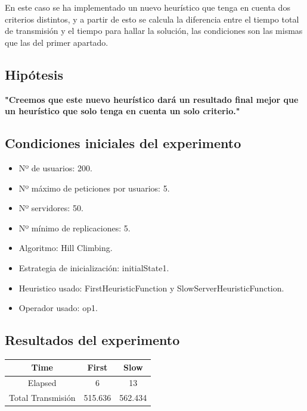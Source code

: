 \documentclass[a4paper,10pt]{report}
\begin{document}
		En este caso se ha implementado un nuevo heurístico que tenga en cuenta dos criterios distintos, y a partir de esto se calcula la diferencia entre el tiempo total de transmisión y el tiempo para hallar la solución, las condiciones son las mismas que las del primer apartado.\newline

        \subsection*{Hipótesis}
		\textbf{"Creemos que este nuevo heurístico dará un resultado final mejor que un heurístico que solo tenga en cuenta un solo criterio."}

		\subsection*{Condiciones iniciales del experimento}
		\begin{itemize}
		    \item Nº de usuarios: 200.
    		\item Nº máximo de peticiones por usuarios: 5.
    		\item Nº servidores: 50.
    		\item Nº mínimo de replicaciones: 5.
    		\item Algoritmo: Hill Climbing.
    		\item Estrategia de inicialización: initialState1.
    		\item Heuristico usado: FirstHeuristicFunction y SlowServerHeuristicFunction.
    		\item Operador usado: op1.
		\end{itemize}

		\subsection*{Resultados del experimento}
		\begin{table}[H]
		\centering
        \begin{tabular}{c|c|c}
            Time & First & Slow \\
            \hline
            \hline
            Elapsed & 6 & 13 \\
            \hline
            Total Transmisión & 515.636 & 562.434 \\
        \end{tabular}
        \end{table}
        
\end{document}
